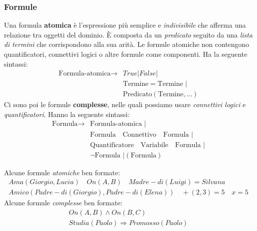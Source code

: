 \subsubsection{Formule}
Una formula \textbf{atomica} è l'espressione più semplice e \textit{indivisibile} che afferma una relazione tra oggetti del dominio. È composta da un \textit{predicato} seguito da una \textit{lista di termini} che corrispondono alla sua arità. Le formule atomiche non contengono quantificatori, connettivi logici o altre formule come componenti. Ha la seguente sintassi:
\begin{align*}
	\text{Formula-atomica} \rightarrow & True \vert False \vert \\
	& \text{Termine} = \text{Termine } \vert\\
	& \text{Predicato}(\text{Termine}, \ldots)
\end{align*}
Ci sono poi le formule \textbf{complesse}, nelle quali possiamo usare \textit{connettivi logici} e \textit{quantificatori}. Hanno la seguente sintassi:
\begin{align*}
	\text{Formula} \rightarrow & \text{Formula-atomica } \vert \\
	& \text{Formula} \quad \text{Connettivo} \quad \text{Formula } \vert \\
	& \text{Quantificatore} \quad \text{Variabile} \quad \text{Formula } \vert \\
	& \neg \text{Formula } \vert (\text{Formula})
\end{align*}

\begin{example}
	Alcune formule \textit{atomiche} ben formate:
	\begin{gather*}
		Ama(Giorgio, Lucia) \quad On(A,B) \quad Madre-di(Luigi) = Silvana \\
		Amico(Padre-di(Giorgio), Padre-di(Elena)) \quad +(2,3)=5 \quad x=5
	\end{gather*}
	Alcune formule \textit{complesse} ben formate:
	\begin{gather*}
		On(A,B) \land On(B,C) \\
		Studia(Paolo) \Rightarrow Promosso(Paolo)
	\end{gather*}
\end{example}

